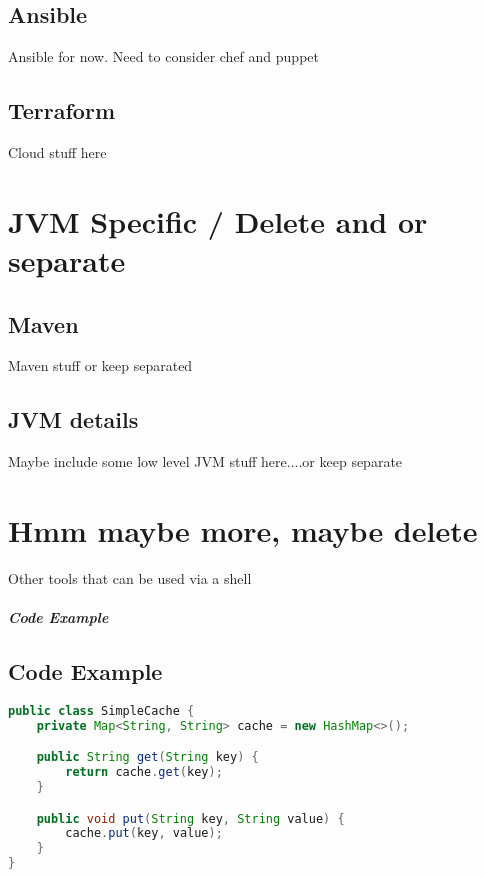 \documentclass[a4paper, 11pt]{book}
\begin{document}
    \section{Ansible}
    Ansible for now. Need to consider chef and puppet


    \section{Terraform}
    Cloud stuff here


    \chapter{JVM Specific / Delete and or separate}


    \section{Maven}
    Maven stuff or keep separated


    \section{JVM details}
    Maybe include some low level JVM stuff here....or keep separate


    \chapter{Hmm maybe more, maybe delete}
    Other tools that can be used via a shell

    \paragraph{Code Example}


    \section{Code Example}
    \begin{lstlisting}[language=Java, caption=Java Code for a Simple Cache]
public class SimpleCache {
    private Map<String, String> cache = new HashMap<>();

    public String get(String key) {
        return cache.get(key);
    }

    public void put(String key, String value) {
        cache.put(key, value);
    }
}
    \end{lstlisting}
\end{document}

